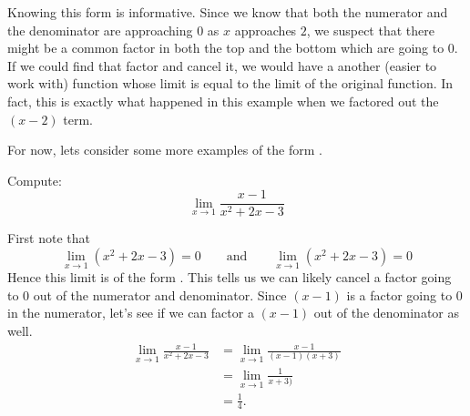 \documentclass{ximera}
\begin{document}
Knowing this form is informative.  Since we know that both the
numerator and the denominator are approaching $0$ as $x$ approaches
$2$, we suspect that there might be a common factor in both the top
and the bottom which are going to $0$.  If we could find that factor
and cancel it, we would have a another (easier to work with) function
whose limit is equal to the limit of the original function.  In fact,
this is exactly what happened in this example when we factored out the
$(x-2)$ term.

For now, lets consider some more examples of the form \zeroOverZero.

\begin{example}
  Compute:
  \[
  \lim_{x\to1}\frac{x-1}{x^2+2x-3}
  \]
  \begin{explanation}
    First note that
    \[
    \lim_{x\to1}\left(x^2+2x-3\right)=0 \qquad\text{and}\qquad  \lim_{x\to1}\left(x^2+2x-3\right) = 0
    \]
    Hence this limit is of the form \zeroOverZero.  This tells us we
    can likely cancel a factor going to $0$ out of the numerator and
    denominator.  Since $(x-1)$ is a factor going to $0$ in the
    numerator, let's see if we can factor a $(x-1)$ out of the
    denominator as well.
    \begin{align*}
      \lim_{x\to1}\frac{x-1}{x^2+2x-3}&=\lim_{x\to1}\frac{x-1}{(x-1)(x+3)} \\
      &=\lim_{x\to1}\frac{1}{x+3)}\\
      &=\frac{1}{4}.
    \end{align*}
  \end{explanation}
\end{example}
\end{document}
